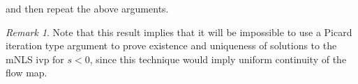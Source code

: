 \documentclass[12pt,reqno]{amsart}
\numberwithin{equation}{section}  %
\numberwithin{figure}{section}
\newcommand{\rr}{\mathbb{R}}
\newcommand{\zz}{\mathbb{Z}}
\newcommand{\ci}{\mathbb{T}}
\newcommand{\wh}{\widehat}
\theoremstyle{plain}
\newtheorem{theorem}{Theorem}
\theoremstyle{definition}
\theoremstyle{remark}
\newtheorem{remark}{Remark}
\begin{document}
and then repeat the above arguments. \qquad \qedsymbol
%
%
\begin{framed}
\begin{remark}
	Note that this result implies that it will be impossible to use a Picard
	iteration type argument to prove existence and uniqueness of solutions to the
	mNLS ivp for $s<0$, since this technique would imply uniform
	continuity of the flow map.
\end{remark}
\end{framed}
%
%
\end{document}
